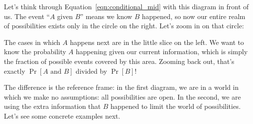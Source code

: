 \documentclass[12 pt]{article}
\newcounter{example}[section]
\begin{document}
Let's think through Equation~\ref{eqn:conditional_mid} with this diagram 
in front of us. The event ``$A$ given $B$'' means we know $B$ happened, 
so now our entire realm of possibilities exists only in the circle 
on the right. Let's zoom in on that circle:

\begin{center}
\end{center}
The cases in which $A$ happens next are in the little slice on the 
left. We want to know the probability $A$ happening given our current 
information, which is simply the fraction of possible events covered by 
this area. Zooming back out, that's exactly $\Pr[A \text{ and } B]$ 
divided by $\Pr[B]$!

The difference is the reference frame: in the first diagram, we are in a 
world in which we make no assumptions: all possibilities are open. In 
the second, we are using the extra information that $B$ happened to 
limit the world of possibilities. Let's see some concrete examples next.
\end{document}
